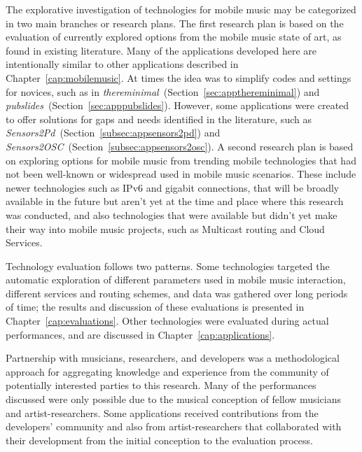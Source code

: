 The explorative investigation of technologies for mobile music may be categorized in two main branches or research plans.
The first research plan is based on the evaluation of currently explored options from the mobile music state of art, as found in existing literature.
Many of the applications developed here are intentionally similar to other applications described in Chapter~\ref{cap:mobilemusic}. At times the idea was to simplify codes and settings for novices, such as in \textit{thereminimal}~(Section~\ref{sec:appthereminimal}) and \textit{pubslides}~(Section~\ref{sec:apppubslides}).
However, some applications were created to offer solutions for gaps and needs identified in the literature, such as \textit{Sensors2Pd}~(Section~\ref{subsec:appsensors2pd}) and \textit{Sensors2OSC}~(Section~\ref{subsec:appsensors2osc}).
A second research plan is based on exploring options for mobile music from trending mobile technologies that had not been well-known or widespread used in mobile music scenarios. These include newer technologies such as IPv6 and gigabit connections, that will be broadly available in the future but aren't yet at the time and place where this research was conducted, and also technologies that were available but didn't yet make their way into mobile music projects, such as Multicast routing and Cloud Services.


Technology evaluation follows two patterns. Some technologies targeted the automatic exploration of different parameters used in mobile music interaction, different services and routing schemes, and data was gathered over long periods of time; the results and discussion of these evaluations is presented in Chapter~\ref{cap:evaluations}.
Other technologies were evaluated during actual performances, and are discussed in Chapter~\ref{cap:applications}.


Partnership with musicians, researchers, and developers was a methodological approach for aggregating knowledge and experience from the community of potentially interested parties to this research.
Many of the performances discussed were only possible due to the musical conception of fellow musicians and artist-researchers.
Some applications received contributions from the developers' community and also from artist-researchers that collaborated with their development from the initial conception to the evaluation process.



